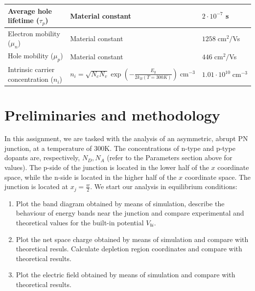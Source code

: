\documentclass{book}
\begin{document}
\begin{center}
\begin{tabular}{ | m{4.5cm} | m{7.5cm} | m{2.5cm} | }
                    \hline
                        Average hole lifetime ($\tau_{p}$) & Material constant & $2 \cdot 10^{-7}$ s \\
                    \hline
                        Electron mobility ($\mu_{n}$) & Material constant & $1258 \; \text{cm}^{2}/$Vs \\
                    \hline
                        Hole mobility ($\mu_{p}$) & Material constant & $446 \; \text{cm}^{2}/$Vs \\
                    \hline
                        Intrinsic carrier concentration ($n_i$) & $n_{i} = \sqrt{N_{c}N_{v}}\exp\left(-\frac{E_{g}}{2k_{B}(T = 300K)}\right) \; \text{cm}^{-3}$  &  $1.01 \cdot 10^{10} \; \text{cm}^{-3}$ \\
                    \hline 
                \end{tabular}
                \renewcommand{\arraystretch}{1}
            \end{center}

        \vspace{30pt}
        \section{Preliminaries and methodology}
            In this assignment, we are tasked with the analysis of an asymmetric, abrupt PN junction, at a temperature of 300K.
            The concentrations of n-type and p-type dopants are, respectively, $N_{D}, N_{A}$ (refer to the Parameters section above for values).
            The p-side of the junction is located in the lower half of the $x$ coordinate space, while the n-side is located in the higher half of the $x$ coordinate space.
            The junction is located at $x_{j} = \frac{w}{2}$.
            We start our analysis in equilibrium conditions:

            \begin{enumerate}[label=(QA\arabic*), leftmargin=1.5cm]
                \item Plot the band diagram obtained by means of simulation, describe the behaviour of energy bands near the junction and compare experimental and theoretical values for the built-in potential $V_{bi}$.
                \item Plot the net space charge obtained by means of simulation and compare with theoretical resuls. Calculate depletion region coordinates and compare with theoretical results.
                \item Plot the electric field obtained by means of simulation and compare with theoretical results.
            \end{enumerate}
\end{document}
